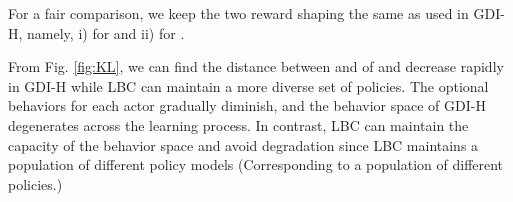 For a fair comparison, we keep the two reward shaping the same as used in  GDI-H, namely,  i)  for  and ii)  for .



\begin{figure*}[!ht]
\vspace{-0.1in}

 
\caption{KL Divergence of GDI-H and LBC in Chopper Command (Smoothed by 0.9 for the ease of reading).}
\label{fig:KL}
\end{figure*}

From Fig. \ref{fig:KL}, we can find the distance between  and  of  and  decrease rapidly in GDI-H while LBC can maintain a more diverse set of policies. The optional behaviors for each actor gradually diminish, and the behavior space of GDI-H degenerates across the learning process. In contrast, LBC can maintain the capacity of the behavior space and avoid degradation since LBC maintains a population of different policy models (Corresponding to a population of different policies.)






